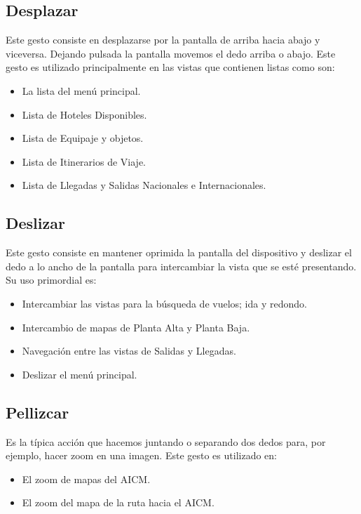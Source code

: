 \subsection{Desplazar}
Este gesto consiste en desplazarse por la pantalla de arriba hacia abajo y viceversa. 
Dejando pulsada la pantalla movemos el dedo arriba o abajo. Este gesto es utilizado principalmente en las vistas que contienen 
listas como son:

\begin{itemize}
 \item La lista del menú principal.
 \item Lista de Hoteles Disponibles.
 \item Lista de Equipaje y objetos.
 \item Lista de Itinerarios de Viaje.
 \item Lista de Llegadas y Salidas Nacionales e Internacionales.
\end{itemize}

\subsection{Deslizar}
Este gesto consiste en mantener oprimida la pantalla del dispositivo y deslizar el dedo a lo ancho de la pantalla para intercambiar 
la vista que se esté presentando. Su uso primordial es:

\begin{itemize}
 \item Intercambiar las vistas para la búsqueda de vuelos; ida y redondo.
 \item Intercambio de mapas de Planta Alta y Planta Baja.
 \item Navegación entre las vistas de Salidas y Llegadas.
 \item Deslizar el menú principal.
\end{itemize}

\subsection{Pellizcar}
Es la típica acción que hacemos juntando o separando dos dedos para, por ejemplo, hacer zoom en una imagen. Este gesto es utilizado en:
\begin{itemize}
 \item El zoom de mapas del AICM.
 \item El zoom del mapa de la ruta hacia el AICM.
\end{itemize}

